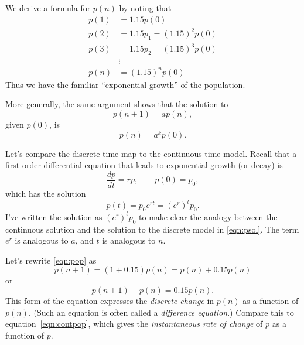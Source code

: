 We derive a formula for $p(n)$ by noting that
\begin{equation}
\begin{split}
   p(1) & = 1.15p(0) \\
   p(2) & = 1.15p_1 = (1.15)^2 p(0) \\
   p(3) & = 1.15p_2 = (1.15)^3 p(0) \\
       & \vdots \\
   p(n) & = (1.15)^n p(0)
\end{split}
\end{equation}
Thus we have the familiar ``exponential growth'' of the
population.

More generally, the same argument shows that the solution
to
\begin{equation}
   p(n+1) = a p(n),
\end{equation}
given $p(0)$, is
\begin{equation}
   p(n) = a^k p(0).
\label{eqn:psol}
\end{equation}

Let's compare the discrete time map to the continuous time model.
Recall that a first order differential equation
that leads to exponential growth
(or decay) is
\begin{equation}
 \frac{dp}{dt} = r p, \quad\quad p(0) = p_0,
\label{eqn:contpop}
\end{equation}
which has the solution
\begin{equation}
  p(t) = p_0e^{rt} = \left( e^r\right)^t p_0.
\end{equation}
I've written the solution as
$\left(e^r\right)^t p_0$ to make clear the analogy
between the continuous solution and the solution to the discrete
model in \eqref{eqn:psol}.
The term $e^r$ is analogous to $a$, and $t$ is analogous to $n$.

Let's rewrite \eqref{eqn:pop} as
\begin{equation}
  p(n+1) = (1 + 0.15)p(n) = p(n) + 0.15p(n)
\end{equation}
or
\begin{equation}
  p(n+1) - p(n) = 0.15p(n) .
\end{equation}
This form of the equation expresses the
\emph{discrete change} in
$p(n)$ as a function of $p(n)$.
(Such an equation is often called a \emph{difference equation}.)
Compare this to equation~\eqref{eqn:contpop}, which gives the
\emph{instantaneous rate of change} of $p$ as a function
of $p$.


